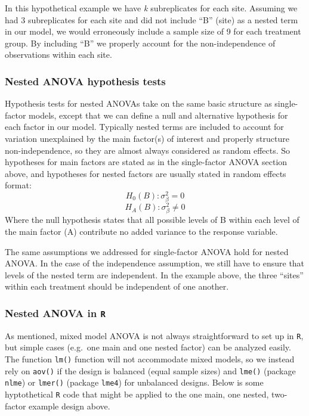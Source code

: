 \documentclass[
]{book}
\begin{document}
In this hypothetical example we have \emph{k} subreplicates for each site. Assuming we had 3 subreplicates for each site and did not include ``B'' (site) as a nested term in our model, we would erroneously include a sample size of 9 for each treatment group. By including ``B'' we properly account for the non-independence of observations within each site.

\hypertarget{nested-anova-hypothesis-tests}{%
\subsubsection{Nested ANOVA hypothesis tests}\label{nested-anova-hypothesis-tests}}

Hypothesis tests for nested ANOVAs take on the same basic structure as single-factor models, except that we can define a null and alternative hypothesis for each factor in our model. Typically nested terms are included to account for variation unexplained by the main factor(s) of interest and properly structure non-independence, so they are almost always considered as random effects. So hypotheses for main factors are stated as in the single-factor ANOVA section above, and hypotheses for nested factors are usually stated in random effects format:
\[H_0(B):\sigma_{\beta}^2=0\]
\[H_A(B):\sigma_{\beta}^2\neq0\]
Where the null hypothesis states that all possible levels of B within each level of the main factor (A) contribute no added variance to the response variable.

The same assumptions we addressed for single-factor ANOVA hold for nested ANOVA. In the case of the independence assumption, we still have to ensure that levels of the nested term are independent. In the example above, the three ``sites'' within each treatment should be independent of one another.

\hypertarget{nested-anova-in-r}{%
\subsubsection{\texorpdfstring{Nested ANOVA in \texttt{R}}{Nested ANOVA in R}}\label{nested-anova-in-r}}

As mentioned, mixed model ANOVA is not always straightforward to set up in \texttt{R}, but simple cases (e.g.~one main and one nested factor) can be analyzed easily. The function \texttt{lm()} function will not accommodate mixed models, so we instead rely on \texttt{aov()} if the design is balanced (equal sample sizes) and \texttt{lme()} (package \texttt{nlme}) or \texttt{lmer()} (package \texttt{lme4}) for unbalanced designs. Below is some hyptothetical \texttt{R} code that might be applied to the one main, one nested, two-factor example design above.
\end{document}
